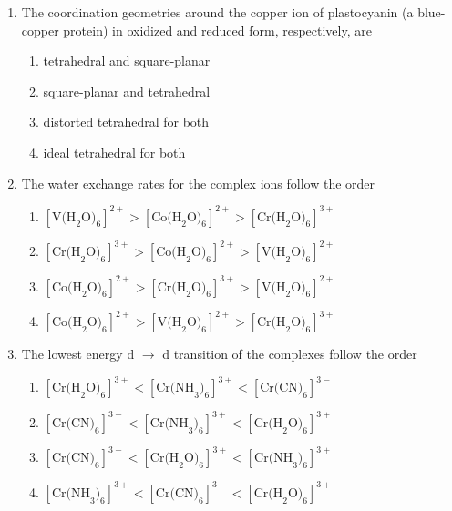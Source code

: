 \documentclass{article}
\begin{document}
\begin{enumerate}
\item The coordination geometries around the copper ion of plastocyanin (a blue-copper protein) 
in oxidized and reduced form, respectively, are
\begin{multicols}{2}
\begin{enumerate}
    \item tetrahedral and square-planar
    \item square-planar and tetrahedral
    \item distorted tetrahedral for both
    \item ideal tetrahedral for both
\end{enumerate}
\end{multicols}

\item The water exchange rates for the complex ions follow the order
\begin{multicols}{2}
\begin{enumerate}
    \item $[\text{V(H}_2\text{O)}_6]^{2+} > [\text{Co(H}_2\text{O)}_6]^{2+} > [\text{Cr(H}_2\text{O)}_6]^{3+}$
    \item $[\text{Cr(H}_2\text{O)}_6]^{3+} > [\text{Co(H}_2\text{O)}_6]^{2+} > [\text{V(H}_2\text{O)}_6]^{2+}$
    \item $[\text{Co(H}_2\text{O)}_6]^{2+} > [\text{Cr(H}_2\text{O)}_6]^{3+} > [\text{V(H}_2\text{O)}_6]^{2+}$
    \item $[\text{Co(H}_2\text{O)}_6]^{2+} > [\text{V(H}_2\text{O)}_6]^{2+} > [\text{Cr(H}_2\text{O)}_6]^{3+}$
\end{enumerate}
\end{multicols}

\item The lowest energy d $\rightarrow$ d transition of the complexes follow the order
\begin{multicols}{2}
\begin{enumerate}
    \item $[\text{Cr(H}_2\text{O)}_6]^{3+} < [\text{Cr(NH}_3)_6]^{3+} < [\text{Cr(CN)}_6]^{3-}$
    \item $[\text{Cr(CN)}_6]^{3-} < [\text{Cr(NH}_3)_6]^{3+} < [\text{Cr(H}_2\text{O)}_6]^{3+}$
    \item $[\text{Cr(CN)}_6]^{3-} < [\text{Cr(H}_2\text{O)}_6]^{3+} < [\text{Cr(NH}_3)_6]^{3+}$
    \item $[\text{Cr(NH}_3)_6]^{3+} < [\text{Cr(CN)}_6]^{3-} < [\text{Cr(H}_2\text{O)}_6]^{3+}$
\end{enumerate}
\end{multicols}


\end{enumerate}
\end{document}
